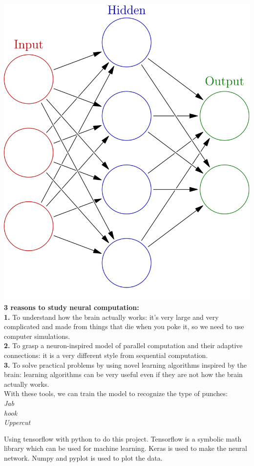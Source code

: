 \documentclass[conference,compsoc]{IEEEtran}
\begin{document}
\includegraphics[scale=.19]{NeuralNetwork.png}
\textbf{3 reasons to study neural computation:}\\
\textbf{1.} To understand how the brain actually works: it's very large and very complicated and made from things that die when you poke it, so we need to use computer simulations.\\
\textbf{2.} To grasp a neuron-inspired model of parallel computation and their adaptive connections: it is a very different style from sequential computation.\\
\textbf{3.} To solve practical problems by using novel learning algorithms inspired by the brain: learning algorithms can be very useful even if they are not how the brain actually works.
\\
With these tools, we can train the model to recognize the type of punches:\\
\textit{Jab\\hook\\Uppercut}

Using tensorflow with python to do this project. Tensorflow is a symbolic math library which can be used for machine learning. Keras is used to make the neural network. Numpy and pyplot is used to plot the data.
\end{document}
